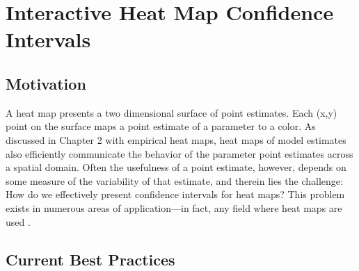 \section{Interactive Heat Map Confidence Intervals}

\subsection{Motivation}

A heat map presents a two dimensional surface of point estimates. Each (x,y) point on the surface maps a point estimate of a parameter to a color. As discussed in Chapter 2 with empirical heat maps, heat maps of model estimates also efficiently communicate the behavior of the parameter point estimates across a spatial domain. Often the usefulness of a point estimate, however, depends on some measure of the variability of that estimate, and therein lies the challenge: How do we effectively present confidence intervals for heat maps? This problem exists in numerous areas of application---in fact, any field where heat maps are used \citep{Emerson}. 

\subsection{Current Best Practices}

